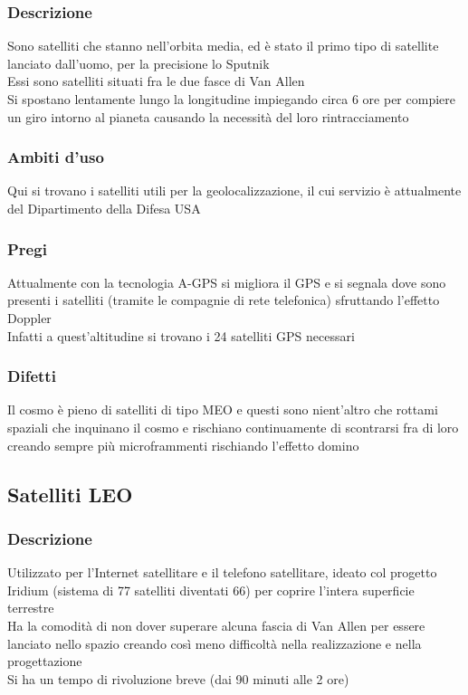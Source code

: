 \documentclass[10pt,oneside,a4paper]{article}
\begin{document}
\subsubsection{Descrizione}
Sono satelliti che stanno nell'orbita media, ed è stato il primo tipo di satellite lanciato dall'uomo, per la precisione lo Sputnik\\
Essi sono satelliti situati fra le due fasce di Van Allen\\
Si spostano lentamente lungo la longitudine impiegando circa 6 ore per compiere un giro intorno al pianeta causando la necessità del loro rintracciamento
\subsubsection{Ambiti d'uso}
Qui si trovano i satelliti utili per la geolocalizzazione, il cui servizio è attualmente del Dipartimento della Difesa USA
\subsubsection{Pregi}
Attualmente con la tecnologia A-GPS si migliora il GPS e si segnala dove sono presenti i satelliti (tramite le compagnie di rete telefonica) sfruttando l'effetto Doppler\\
Infatti a quest'altitudine si trovano i 24 satelliti GPS necessari
\subsubsection{Difetti}
Il cosmo è pieno di satelliti di tipo MEO e questi sono nient'altro che rottami spaziali che inquinano il cosmo e rischiano continuamente di scontrarsi fra di loro creando sempre più microframmenti rischiando l'effetto domino
\subsection{Satelliti LEO}
\subsubsection{Descrizione}
Utilizzato per l'Internet satellitare e il telefono satellitare, ideato col progetto Iridium (sistema di 77 satelliti diventati 66) per coprire l'intera superficie terrestre\\
Ha la comodità di non dover superare alcuna fascia di Van Allen per essere lanciato nello spazio creando così meno difficoltà nella realizzazione e nella progettazione\\
Si ha un tempo di rivoluzione breve (dai 90 minuti alle 2 ore)
\end{document}
